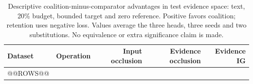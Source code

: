 \begin{table}[!htbp]\centering\small
\caption{Descriptive coalition-minus-comparator advantages in test evidence space: text, 20\% budget, bounded target and zero reference. Positive favors coalition; retention uses negative loss. Values average the three heads, three seeds and two substitutions. No equivalence or extra significance claim is made.}\label{tab:test-comparators}
\begin{tabular}{llrrr}\toprule Dataset & Operation & Input occlusion & Evidence occlusion & Evidence IG \\\midrule
@@ROWS@@
\bottomrule\end{tabular}\end{table}